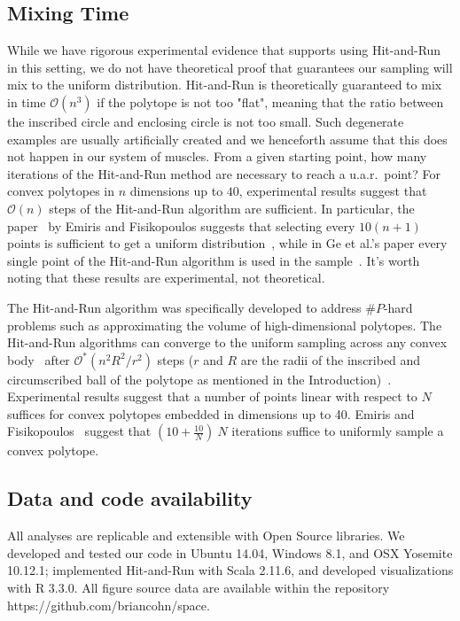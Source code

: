 \documentclass[letterpaper]{article}
\begin{document}
\subsection*{Mixing Time}
\label{sec_lengthrun}
While we have rigorous experimental evidence that supports using Hit-and-Run in this setting, we do not have theoretical proof that guarantees our sampling will mix to the uniform distribution. Hit-and-Run is theoretically guaranteed to mix in time $\mathcal{O}(n^3)$ if the polytope is not too "flat", meaning that the ratio between the inscribed circle and enclosing circle is not too small. Such degenerate examples are usually artificially created and we henceforth assume that this does not happen in our system of muscles.
From a given starting point, how many iterations of the Hit-and-Run method are necessary to reach a u.a.r.\ point?
For convex polytopes in $n$ dimensions up to $40$, experimental results suggest that $\mathcal{O}(n)$ steps of the Hit-and-Run algorithm are sufficient.
In particular, the paper~\cite{emiris2013efficient} by Emiris and Fisikopoulos suggests that selecting every $10(n + 1)$ points is sufficient to get a uniform distribution~\cite{emiris2013efficient}, while in Ge et al.'s paper every single point of the Hit-and-Run algorithm is used in the sample~\cite{Ge}. It's worth noting that these results are experimental, not theoretical.


The Hit-and-Run algorithm was specifically developed to address $\#P$-hard problems such as approximating the volume of high-dimensional polytopes\cite{Dyer}. The Hit-and-Run algorithms can converge to the uniform sampling across any convex body~\cite{smith1984efficient} after $\mathcal{O}^*(n^2R^2/r^2)$ steps ($r$ and $R$ are the radii of the inscribed and circumscribed ball of the polytope as mentioned in the Introduction)~\cite{Dyer, Lovasz}. Experimental results suggest that a number of points linear with respect to $N$ suffices for convex polytopes embedded in dimensions up to 40. Emiris and Fisikopoulos~\cite{emiris2013efficient} suggest that $(10 + \frac{10}{N})~N$ iterations suffice to uniformly sample a convex polytope.

\subsection*{Data and code availability}
All analyses are replicable and extensible with Open Source libraries. We developed and tested our code in Ubuntu 14.04, Windows 8.1, and OSX Yosemite 10.12.1; implemented Hit-and-Run with Scala 2.11.6, and developed visualizations with R 3.3.0.
All figure source data are available within the repository https://github.com/briancohn/space.
\end{document}
